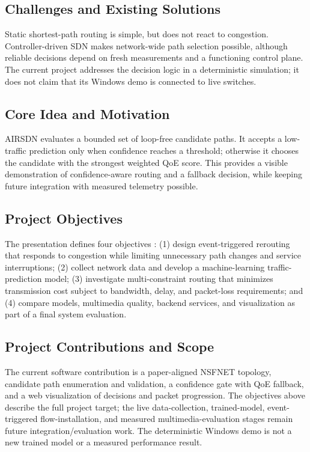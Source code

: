 \documentclass[conference]{IEEEtran}
\begin{document}
\subsection{Challenges and Existing Solutions}
Static shortest-path routing is simple, but does not react to congestion. Controller-driven SDN makes network-wide path selection possible, although reliable decisions depend on fresh measurements and a functioning control plane. The current project addresses the decision logic in a deterministic simulation; it does not claim that its Windows demo is connected to live switches.

\subsection{Core Idea and Motivation}
AIRSDN evaluates a bounded set of loop-free candidate paths. It accepts a low-traffic prediction only when confidence reaches a threshold; otherwise it chooses the candidate with the strongest weighted QoE score. This provides a visible demonstration of confidence-aware routing and a fallback decision, while keeping future integration with measured telemetry possible.

\subsection{Project Objectives}
The presentation defines four objectives \cite{airsdn_presentation}: (1) design event-triggered rerouting that responds to congestion while limiting unnecessary path changes and service interruptions; (2) collect network data and develop a machine-learning traffic-prediction model; (3) investigate multi-constraint routing that minimizes transmission cost subject to bandwidth, delay, and packet-loss requirements; and (4) compare models, multimedia quality, backend services, and visualization as part of a final system evaluation.

\subsection{Project Contributions and Scope}
The current software contribution is a paper-aligned NSFNET topology, candidate path enumeration and validation, a confidence gate with QoE fallback, and a web visualization of decisions and packet progression. The objectives above describe the full project target; the live data-collection, trained-model, event-triggered flow-installation, and measured multimedia-evaluation stages remain future integration/evaluation work. The deterministic Windows demo is not a new trained model or a measured performance result.
\end{document}
